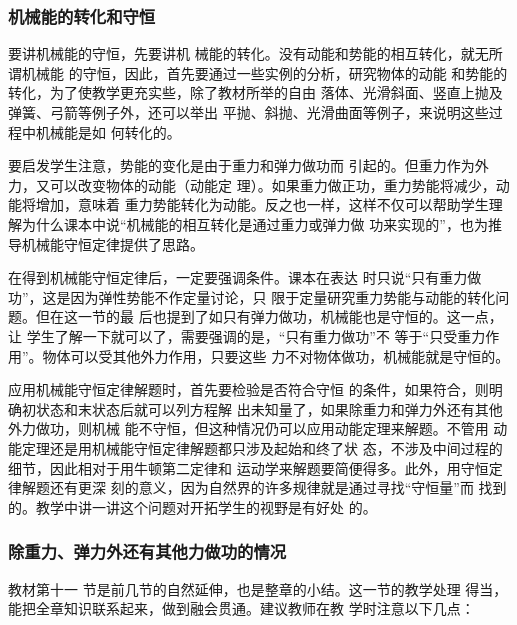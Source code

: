 \subsubsection{机械能的转化和守恒}

要讲机械能的守恒，先要讲机
械能的转化。没有动能和势能的相互转化，就无所谓机械能
的守恒，因此，首先要通过一些实例的分析，研究物体的动能
和势能的转化，为了使教学更充实些，除了教材所举的自由
落体、光滑斜面、竖直上抛及弹簧、弓箭等例子外，还可以举出
平抛、斜抛、光滑曲面等例子，来说明这些过程中机械能是如
何转化的。

要启发学生注意，势能的变化是由于重力和弹力做功而
引起的。但重力作为外力，又可以改变物体的动能（动能定
理）。如果重力做正功，重力势能将减少，动能将增加，意味着
重力势能转化为动能。反之也一样，这样不仅可以帮助学生理
解为什么课本中说“机械能的相互转化是通过重力或弹力做
功来实现的”，也为推导机械能守恒定律提供了思路。

在得到机械能守恒定律后，一定要强调条件。课本在表达
时只说“只有重力做功”，这是因为弹性势能不作定量讨论，只
限于定量研究重力势能与动能的转化问题。但在这一节的最
后也提到了如只有弹力做功，机械能也是守恒的。这一点，让
学生了解一下就可以了，需要强调的是，“只有重力做功”不
等于“只受重力作用”。物体可以受其他外力作用，只要这些
力不对物体做功，机械能就是守恒的。

应用机械能守恒定律解题时，首先要检验是否符合守恒
的条件，如果符合，则明确初状态和末状态后就可以列方程解
出未知量了，如果除重力和弹力外还有其他外力做功，则机械
能不守恒，但这种情况仍可以应用动能定理来解题。不管用
动能定理还是用机械能守恒定律解题都只涉及起始和终了状
态，不涉及中间过程的细节，因此相对于用牛顿第二定律和
运动学来解题要简便得多。此外，用守恒定律解题还有更深
刻的意义，因为自然界的许多规律就是通过寻找“守恒量”而
找到的。教学中讲一讲这个问题对开拓学生的视野是有好处
的。

\subsubsection{除重力、弹力外还有其他力做功的情况}

教材第十一
节是前几节的自然延伸，也是整章的小结。这一节的教学处理
得当，能把全章知识联系起来，做到融会贯通。建议教师在教
学时注意以下几点：

